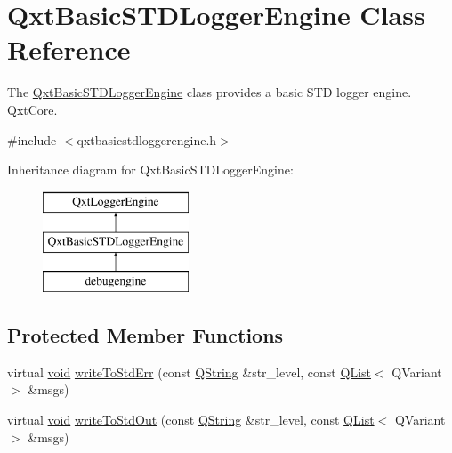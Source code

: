 \hypertarget{class_qxt_basic_s_t_d_logger_engine}{\section{Qxt\-Basic\-S\-T\-D\-Logger\-Engine Class Reference}
\label{class_qxt_basic_s_t_d_logger_engine}
}


The \hyperlink{class_qxt_basic_s_t_d_logger_engine}{Qxt\-Basic\-S\-T\-D\-Logger\-Engine} class provides a basic S\-T\-D logger engine.  Qxt\-Core.  




{\ttfamily \#include $<$qxtbasicstdloggerengine.\-h$>$}

Inheritance diagram for Qxt\-Basic\-S\-T\-D\-Logger\-Engine\-:\begin{figure}[H]
\begin{center}
\leavevmode
\includegraphics[height=3.000000cm]{class_qxt_basic_s_t_d_logger_engine}
\end{center}
\end{figure}
\subsection*{Protected Member Functions}
\begin{DoxyCompactItemize}
\item 
virtual \hyperlink{group___u_a_v_objects_plugin_ga444cf2ff3f0ecbe028adce838d373f5c}{void} \hyperlink{class_qxt_basic_s_t_d_logger_engine_a012038102fefc38e53a89ee48ee17dd2}{write\-To\-Std\-Err} (const \hyperlink{group___u_a_v_objects_plugin_gab9d252f49c333c94a72f97ce3105a32d}{Q\-String} \&str\-\_\-level, const \hyperlink{class_q_list}{Q\-List}$<$ Q\-Variant $>$ \&msgs)
\item 
virtual \hyperlink{group___u_a_v_objects_plugin_ga444cf2ff3f0ecbe028adce838d373f5c}{void} \hyperlink{class_qxt_basic_s_t_d_logger_engine_af1b4ff58645eb75c53ed64d5047d30ec}{write\-To\-Std\-Out} (const \hyperlink{group___u_a_v_objects_plugin_gab9d252f49c333c94a72f97ce3105a32d}{Q\-String} \&str\-\_\-level, const \hyperlink{class_q_list}{Q\-List}$<$ Q\-Variant $>$ \&msgs)
\end{DoxyCompactItemize}


